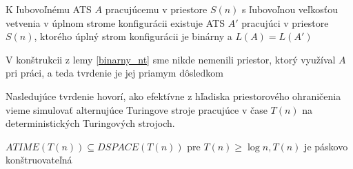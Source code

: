 \begin{lema}\label{binarny_nt2}
K ľubovoľnému ATS $A$ pracujúcemu v priestore $S(n)$ s ľubovoľnou
veľkosťou vetvenia v úplnom strome konfigurácii existuje ATS $A'$
pracujúci v priestore $S(n)$, ktorého úplný strom konfigurácii je
binárny a $L(A)=L(A')$
\end{lema}

\begin{dokaz}
V konštrukcii z lemy \ref{binarny_nt} sme nikde nemenili priestor,
ktorý využíval $A$ pri práci, a teda tvrdenie je jej priamym
dôsledkom
\end{dokaz}

Nasledujúce tvrdenie hovorí, ako efektívne z hľadiska
priestorového ohraničenia vieme simulovať alternujúce Turingove
stroje pracujúce v čase $T(n)$ na deterministických Turingových
strojoch.

\begin{veta}
\label{atimedspace} $ATIME(T(n))\subseteq DSPACE(T(n))$ pre
$T(n)\geq\log n, T(n)$ je páskovo konštruovateľná
\end{veta}

